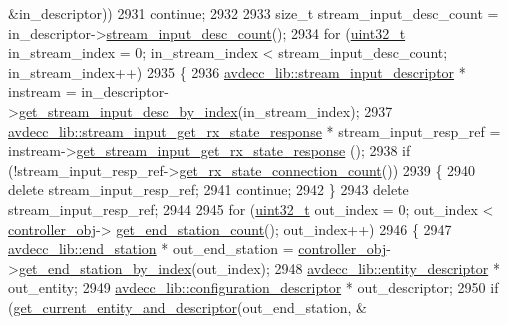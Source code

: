 \begin{DoxyCode}
      &in\_descriptor))
2931             \textcolor{keywordflow}{continue};
2932 
2933         \textcolor{keywordtype}{size\_t} stream\_input\_desc\_count = in\_descriptor->\hyperlink{classavdecc__lib_1_1configuration__descriptor_ab7ef88f0a1d5d8c27f0c4c6687f6a98e}{stream\_input\_desc\_count}();
2934         \textcolor{keywordflow}{for} (\hyperlink{parse_8c_a6eb1e68cc391dd753bc8ce896dbb8315}{uint32\_t} in\_stream\_index = 0; in\_stream\_index < stream\_input\_desc\_count; 
      in\_stream\_index++)
2935         \{
2936             \hyperlink{classavdecc__lib_1_1stream__input__descriptor}{avdecc\_lib::stream\_input\_descriptor} * instream = 
      in\_descriptor->\hyperlink{classavdecc__lib_1_1configuration__descriptor_a69cfe9032cea21937b4153878f8a925c}{get\_stream\_input\_desc\_by\_index}(in\_stream\_index);
2937             \hyperlink{classavdecc__lib_1_1stream__input__get__rx__state__response}{avdecc\_lib::stream\_input\_get\_rx\_state\_response} * 
      stream\_input\_resp\_ref = instream->\hyperlink{classavdecc__lib_1_1stream__input__descriptor_a16a103984d891491a224e518ace35b06}{get\_stream\_input\_get\_rx\_state\_response}
      ();
2938             \textcolor{keywordflow}{if} (!stream\_input\_resp\_ref->\hyperlink{classavdecc__lib_1_1stream__input__get__rx__state__response_a053075d490d7b1261fe95fbe8127fdd0}{get\_rx\_state\_connection\_count}())
2939             \{
2940                 \textcolor{keyword}{delete} stream\_input\_resp\_ref;
2941                 \textcolor{keywordflow}{continue};
2942             \}
2943             \textcolor{keyword}{delete} stream\_input\_resp\_ref;
2944 
2945             \textcolor{keywordflow}{for} (\hyperlink{parse_8c_a6eb1e68cc391dd753bc8ce896dbb8315}{uint32\_t} out\_index = 0; out\_index < \hyperlink{classcmd__line_af0a7784509e5bf1210a2aa19cea5df70}{controller\_obj}->
      \hyperlink{classavdecc__lib_1_1controller_ab5ddf7b4a9718fe3e821289141f44485}{get\_end\_station\_count}(); out\_index++)
2946             \{
2947                 \hyperlink{classavdecc__lib_1_1end__station}{avdecc\_lib::end\_station} * out\_end\_station = 
      \hyperlink{classcmd__line_af0a7784509e5bf1210a2aa19cea5df70}{controller\_obj}->\hyperlink{classavdecc__lib_1_1controller_a2a8ec1205ea0d5fdd6f833285257d0d0}{get\_end\_station\_by\_index}(out\_index);
2948                 \hyperlink{classavdecc__lib_1_1entity__descriptor}{avdecc\_lib::entity\_descriptor} * out\_entity;
2949                 \hyperlink{classavdecc__lib_1_1configuration__descriptor}{avdecc\_lib::configuration\_descriptor} * out\_descriptor;
2950                 \textcolor{keywordflow}{if} (\hyperlink{classcmd__line_aa22ed7f036749918eb875043f10060c9}{get\_current\_entity\_and\_descriptor}(out\_end\_station, &

\end{DoxyCode}
